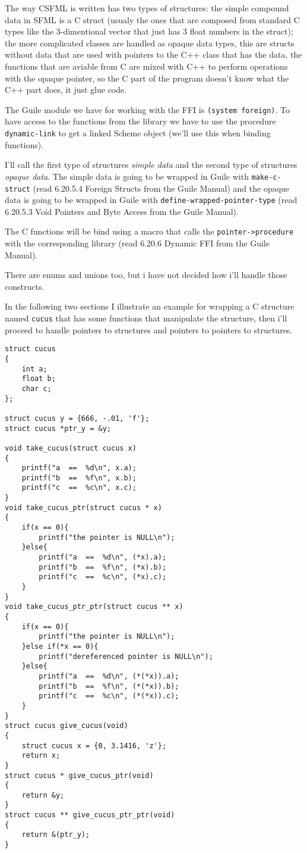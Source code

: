\documentclass[latterpaper, leqno]{article}
\begin{document}
The way CSFML is written has two types of structures: the simple compound data in SFML is a C struct (usualy the ones that are composed from standard C types like the 3-dimentional vector that just has 3 float numbers in the struct); the more complicated classes are handled as opaque data types, this are structs without data that are used with pointers to the C++ class that has the data, the functions that are aviable from C are mixed with C++ to perform operations with the opaque pointer, so the C part of the program doesn't know what the C++ part does, it just glue code.

\bigskip

The Guile module we have for working with the FFI is \texttt{(system foreign)}. To have access to the functions from the library we have to use the procedure \texttt{dynamic-link} to get a linked Scheme object (we'll use this when binding functions).

I'll call the first type of structures \emph{simple data} and the second type of structures \emph{opaque data}. The simple data is going to be wrapped in Guile with \texttt{make-c-struct} (read 6.20.5.4 Foreign Structs from the Guile Manual) and the opaque data is going to be wrapped in Guile with \texttt{define-wrapped-pointer-type} (read 6.20.5.3 Void Pointers and Byte Access from the Guile Manual).

The C functions will be bind using a macro that calls the \texttt{pointer->procedure} with the corresponding library (read 6.20.6 Dynamic FFI from the Guile Manual).

There are enums and unions too, but i have not decided how i'll handle those constructs.

\bigskip

In the following two sections I illustrate an example for wrapping a C structure named \texttt{cucus} that has some functions that manipulate the structure, then i'll proceed to handle pointers to structures and pointers to pointers to structures.

\begin{verbatim}
struct cucus
{
    int a;
    float b;
    char c;
};

struct cucus y = {666, -.01, 'f'};
struct cucus *ptr_y = &y;

void take_cucus(struct cucus x)
{
    printf("a  ==  %d\n", x.a);
    printf("b  ==  %f\n", x.b);
    printf("c  ==  %c\n", x.c);
}
void take_cucus_ptr(struct cucus * x)
{
    if(x == 0){
        printf("the pointer is NULL\n");
    }else{
        printf("a  ==  %d\n", (*x).a);
        printf("b  ==  %f\n", (*x).b);
        printf("c  ==  %c\n", (*x).c);
    }
}
void take_cucus_ptr_ptr(struct cucus ** x)
{
    if(x == 0){
        printf("the pointer is NULL\n");
    }else if(*x == 0){
        printf("dereferenced pointer is NULL\n");
    }else{
        printf("a  ==  %d\n", (*(*x)).a);
        printf("b  ==  %f\n", (*(*x)).b);
        printf("c  ==  %c\n", (*(*x)).c);
    }
}
struct cucus give_cucus(void)
{
    struct cucus x = {0, 3.1416, 'z'};
    return x;
}
struct cucus * give_cucus_ptr(void)
{
    return &y;
}
struct cucus ** give_cucus_ptr_ptr(void)
{
    return &(ptr_y);
}
\end{verbatim}
\end{document}
